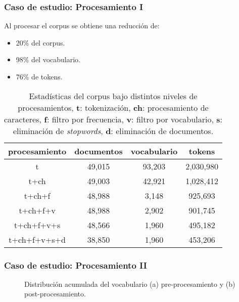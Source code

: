 \documentclass[
	spanish, %
	aspectratio=43, %
	hyperref={pdfencoding=auto,psdextra},
	xcolor={dvipsnames,table,usenames},
]{beamer}
\begin{document}
\begin{frame}[t]
\frametitle{Caso de estudio: Procesamiento I}
Al procesar el corpus se obtiene una reducción de:
\begin{itemize}
  \item 20\% del corpus.
  \item 98\% del vocabulario. 
  \item 76\% de tokens.
\end{itemize}
\begin{table}[H]
  \begin{tabular}{|c|c|c|c|}
  \hline
  procesamiento & documentos & vocabulario & tokens    \\ \hline
  t             & 49,015     & 93,203      & 2,030,980 \\ \hline
  t+ch          & 49,003     & 42,921      & 1,028,412 \\ \hline
  t+ch+f        & 48,988     & 3,148       & 925,693   \\ \hline
  t+ch+f+v      & 48,988     & 2,902       & 901,745   \\ \hline
  t+ch+f+v+s    & 48,566     & 1,960       & 495,182   \\ \hline
  t+ch+f+v+s+d  & 38,850     & 1,960       & 453,206   \\ \hline
  \end{tabular}
  \caption{Estadísticas del corpus bajo distintos niveles de procesamientos, \textbf{t}: tokenización, \textbf{ch}: procesamiento de caracteres, \textbf{f}: filtro por frecuencia, \textbf{v}: filtro por vocabulario, \textbf{s}: eliminación de \textit{stopwords}, \textbf{d}: eliminación de documentos.}
\end{table}
\end{frame}


\begin{frame}[t]
\frametitle{Caso de estudio: Procesamiento II}

\begin{figure}
  \caption{Distribución acumulada del vocabulario (a) pre-procesamiento y (b) post-procesamiento.}
\end{figure}

\end{frame}
\end{document}
